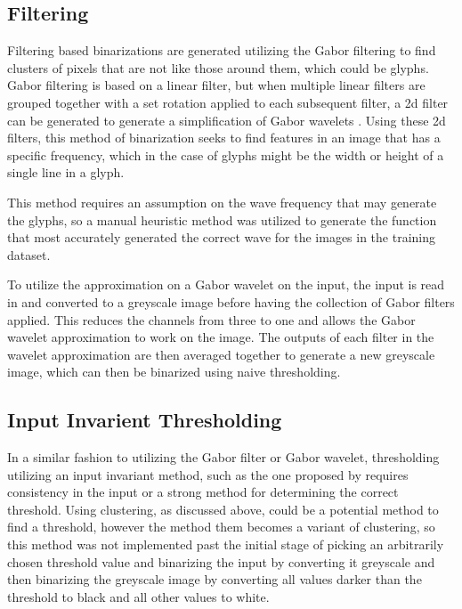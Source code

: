 \subsection{Filtering}

Filtering based binarizations are generated utilizing the Gabor filtering  \cite{Gabor1949, Gabor1948} to find clusters of pixels that are not like those around them, which could be glyphs. Gabor filtering is based on a linear filter, but when multiple linear filters are grouped together with a set rotation applied to each subsequent filter, a 2d filter can be generated to generate a simplification of Gabor wavelets \cite{Gabor1949, Gabor1948}. Using these 2d filters, this method of binarization seeks to find features in an image that has a specific frequency, which in the case of glyphs might be the width or height of a single line in a glyph.

This method requires an assumption on the wave frequency that may generate the glyphs, so a manual heuristic method was utilized to generate the function that most accurately generated the correct wave for the images in the training dataset.

To utilize the approximation on a Gabor wavelet on the input, the input is read in and converted to a greyscale image before having the collection of Gabor filters applied. This reduces the channels from three to one and allows the Gabor wavelet approximation to work on the image. The outputs of each filter in the wavelet approximation are then averaged together to generate a new greyscale image, which can then be binarized using naive thresholding.

\subsection{Input Invarient Thresholding}

In a similar fashion to utilizing the Gabor filter or Gabor wavelet, thresholding utilizing an input invariant method, such as the one proposed by \cite{Bar-Yosef2005, Bar-Yosef2007} requires consistency in the input or a strong method for determining the correct threshold. Using clustering, as discussed above, could be a potential method to find a threshold, however the method them becomes a variant of clustering, so this method was not implemented past the initial stage of picking an arbitrarily chosen threshold value and binarizing the input by converting it greyscale and then binarizing the greyscale image by converting all values darker than the threshold to black and all other values to white.

